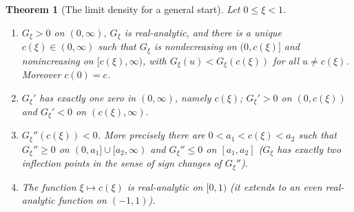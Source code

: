 \documentclass[11pt,a4paper]{article}
\newtheorem{theorem}{Theorem}[section]
\theoremstyle{definition}
\theoremstyle{remark}
\begin{document}
\begin{theorem}[The limit density for a general start]\label{thm:Gxi}
Let $0\le\xi<1$.
\begin{enumerate}
\item $G_\xi>0$ on $(0,\infty)$, $G_\xi$ is real-analytic, and there is a unique $c(\xi)\in(0,\infty)$
such that $G_\xi$ is nondecreasing on $(0,c(\xi)]$ and nonincreasing on $[c(\xi),\infty)$, with
$G_\xi(u)<G_\xi(c(\xi))$ for all $u\ne c(\xi)$. Moreover $c(0)=c$.
\item $G_\xi'$ has exactly one zero in $(0,\infty)$, namely $c(\xi)$; $G_\xi'>0$ on $(0,c(\xi))$ and $G_\xi'<0$ on
$(c(\xi),\infty)$.
\item $G_\xi''(c(\xi))<0$. More precisely there are $0<a_1<c(\xi)<a_2$ such that $G_\xi''\ge0$ on $(0,a_1]\cup[a_2,\infty)$
and $G_\xi''\le0$ on $[a_1,a_2]$ ($G_\xi$ has exactly two inflection points in the sense of sign changes of $G_\xi''$).
\item The function $\xi\mapsto c(\xi)$ is real-analytic on $[0,1)$ (it extends to an even real-analytic function on
$(-1,1)$).
\end{enumerate}
\end{theorem}
\end{document}
